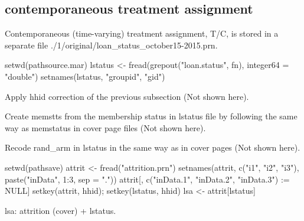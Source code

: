 


\subsection{contemporaneous treatment assignment}


Contemporaneous (time-varying) treatment assignment, T/C, is stored in a separate file \textsf{\footnotesize./1/original/loan\_status\_october15-2015.prn}. 
\begin{Schunk}
\begin{Sinput}
setwd(pathsource.mar)
lstatus <- fread(grepout("loan.status", fn), integer64 = "double")
setnames(lstatus, "groupid", "gid")
\end{Sinput}
\end{Schunk}
Apply hhid correction of the previous subsection (Not shown here).

Create \textsf{memstts} from the membership status in lstatus file by following the same way as \textsf{memstatus} in cover page files (Not shown here).

Recode \textsf{rand\_arm} in lstatus in the same way as in cover pages (Not shown here).

\begin{Schunk}
\begin{Sinput}
setwd(pathsave)
attrit <- fread("attrition.prn")
setnames(attrit, c("i1", "i2", "i3"), paste("inData", 1:3, sep = "."))
attrit[, c("inData.1", "inData.2", "inData.3") := NULL]
setkey(attrit, hhid); setkey(lstatus, hhid)
lsa <- attrit[lstatus]
\end{Sinput}
\end{Schunk}
\textsf{lsa: attrition (cover) + lstatus}.

